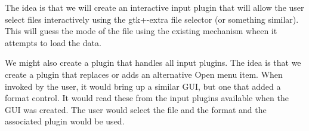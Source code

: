 The idea is that we will create an interactive input plugin that will
allow the user select files interactively using the gtk+-extra file
selector (or something similar).  This will guess the mode of the file
using the existing mechanism wheen it attempts to load the data.

We might also create a plugin that handles all input plugins.  The
idea is that we create a plugin that replaces or adds an alternative
Open menu item.  When invoked by the user, it would bring up a similar
GUI, but one that added a format control.  It would read these from
the input plugins available when the GUI was created.  The user would
select the file and the format and the associated plugin would be
used.



